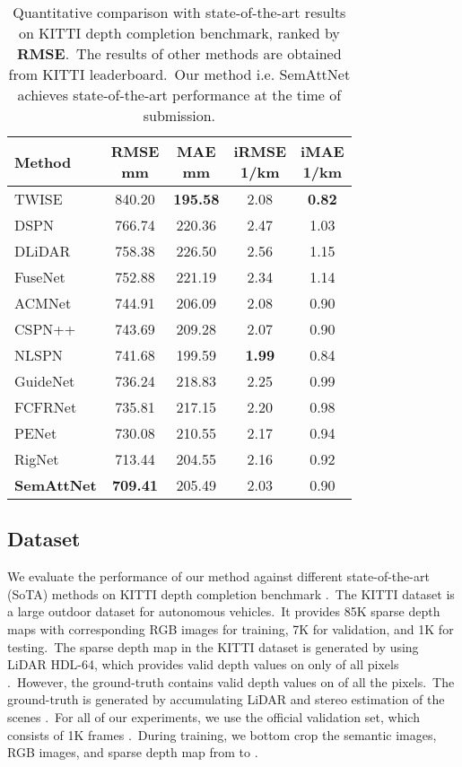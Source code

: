 \documentclass{ieeeaccess}
\begin{document}
\begin{table}


\begin{tabular}{l|cccc}
\hline
Method & \makecell{RMSE \\ mm} & \makecell{MAE \\ mm} & \makecell{iRMSE \\ 1/km} & \makecell{iMAE \\ 1/km}\\
\hline
TWISE \cite{imran2021depth} & 840.20 & \textbf{195.58} & 2.08 & \textbf{0.82}  \\
DSPN \cite{dspn} & 766.74 & 220.36 & 2.47 & 1.03  \\
DLiDAR \cite{Qiu_2019_CVPR} & 758.38 & 226.50 & 2.56 & 1.15  \\
FuseNet \cite{chen2019learning} & 752.88 & 221.19 & 2.34 & 1.14  \\
ACMNet \cite{zhao2021adaptive} & 744.91 & 206.09 & 2.08 & 0.90  \\
CSPN++ \cite{cheng2020cspn++} & 743.69 & 209.28 & 2.07 & 0.90  \\
NLSPN \cite{park2020non} & 741.68 & 199.59 & \textbf{1.99} & 0.84  \\
GuideNet \cite{tang2020learning} & 736.24 & 218.83 & 2.25 & 0.99  \\
FCFRNet \cite{liu2021fcfr} & 735.81 & 217.15 & 2.20 & 0.98  \\
PENet \cite{hu2020PENet} & 730.08 & 210.55 & 2.17 & 0.94  \\
RigNet \cite{yan2021rignet} & 713.44 & 204.55 & 2.16 & 0.92  \\
\hline
\textbf{SemAttNet} & \textbf{709.41} & 205.49 & 2.03 & 0.90  \\
\hline
\end{tabular}
\caption{Quantitative comparison with state-of-the-art results on KITTI depth completion benchmark, ranked by \textbf{RMSE}.~The results of other methods are obtained from KITTI leaderboard.~Our method i.e. SemAttNet achieves state-of-the-art performance at the time of submission.}
\label{table1}
\vspace{-11pt}
\end{table}
\subsection{Dataset}

We evaluate the performance of our method against different state-of-the-art (SoTA) methods on KITTI depth completion benchmark \cite{KITTI, kitti_2}.~The KITTI dataset is a large outdoor dataset for autonomous vehicles.~It provides 85K sparse depth maps with corresponding RGB images for training, 7K for validation, and 1K for testing.~The sparse depth map in the KITTI dataset is generated by using LiDAR HDL-64, which provides valid depth values on only  of all pixels \cite{KITTI, kitti_2}.~However, the ground-truth contains valid depth values on  of all the pixels.~The ground-truth is generated by accumulating LiDAR and stereo estimation of the scenes \cite{KITTI, kitti_2}.~For all of our experiments, we use the official validation set, which consists of 1K frames  \cite{KITTI, kitti_2}.~During training, we bottom crop the semantic images, RGB images, and sparse depth map from  to . 
\end{document}
